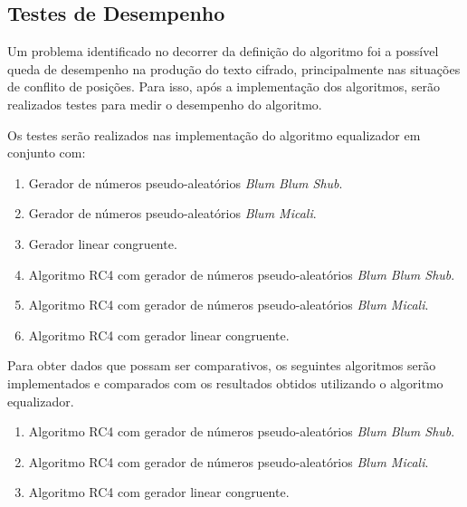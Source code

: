 	\subsection{Testes de Desempenho}
	\label{tests}
	
	Um problema identificado no decorrer da definição do algoritmo foi a possível queda de desempenho na produção do texto cifrado, principalmente nas situações de conflito de posições. Para isso, após a implementação dos algoritmos, serão realizados testes para medir o desempenho do algoritmo.

	Os testes serão realizados nas implementação do algoritmo equalizador em conjunto com:
	\begin{enumerate}
		\item Gerador de números pseudo-aleatórios \textit{Blum Blum Shub}.
		\item Gerador de números pseudo-aleatórios \textit{Blum Micali}.
		\item Gerador linear congruente. 
		\item Algoritmo RC4 com gerador de números pseudo-aleatórios \textit{Blum Blum Shub}.
		\item Algoritmo RC4 com gerador de números pseudo-aleatórios \textit{Blum Micali}.
		\item Algoritmo RC4 com gerador linear congruente.
	\end{enumerate}
	
	Para obter dados que possam ser comparativos, os seguintes algoritmos serão implementados e comparados com os resultados obtidos utilizando o algoritmo equalizador.
	
	\begin{enumerate}
		\item Algoritmo RC4 com gerador de números pseudo-aleatórios \textit{Blum Blum Shub}.
		\item Algoritmo RC4 com gerador de números pseudo-aleatórios \textit{Blum Micali}.
		\item Algoritmo RC4 com gerador linear congruente.
	\end{enumerate}

	
	

